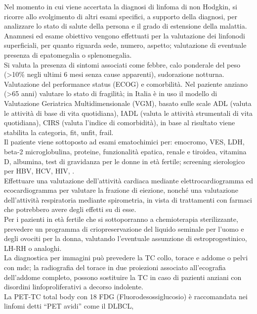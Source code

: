 Nel momento in cui viene accertata la diagnosi di linfoma di non Hodgkin, si ricorre allo svolgimento di altri 
esami specifici, a supporto della diagnosi, per analizzare lo stato di salute della persona e il grado di 
estensione della malattia.\\
Anamnesi ed esame obiettivo vengono effettuati per la valutazione dei linfonodi superficiali, per quanto riguarda sede, numero, aspetto; 
valutazione di eventuale presenza di epatomegalia o splenomegalia.\\
Si valuta la presenza di sintomi associati come febbre, calo ponderale del peso 
(>10\% negli ultimi 6 mesi senza cause apparenti), sudorazione notturna\cite{reteveneta}.\\
Valutazione del performance status (ECOG) e comorbilità. 
Nel paziente anziano (>65 anni) valutare lo stato di fragilità; in Italia è in uso il modello di 
Valutazione Geriatrica Multidimensionale (VGM), basato sulle scale ADL (valuta le attività di base di vita quotidiana),
 IADL (valuta le attività strumentali di vita quotidiana), CIRS (valuta l’indice di comorbidità), 
 in base al risultato viene stabilita la categoria, fit, unfit, frail\cite{reteveneta}.\\
 Il paziente viene sottoposto ad esami ematochimici per: emocromo, VES, LDH, beta-2 microglobulina, proteine, 
 funzionalità epatica, renale e tiroidea, vitamina D, albumina, test di gravidanza per le donne in età fertile; 
 screening sierologico per HBV, HCV, HIV\cite{AIOM}, \cite{reteveneta}.\\
Effettuare una valutazione dell’attività cardiaca mediante elettrocardiogramma ed ecocardiogramma per valutare 
la frazione di eiezione, nonché una valutazione dell’attività respiratoria mediante spirometria, in vista di 
trattamenti con farmaci che potrebbero avere degli effetti su di esse\cite{AIOM}.\\ 
Per i pazienti in età fertile che si sottoporranno a chemioterapia sterilizzante, prevedere un programma di 
criopreservazione del liquido seminale per l’uomo e degli ovociti per la donna, valutando l’eventuale assunzione di 
estroprogestinico, LH-RH o analoghi\cite{AIOM}.\\
La diagnostica per immagini può prevedere la TC collo, torace e addome o pelvi con mdc; la radiografia del torace 
in due proiezioni associato all’ecografia dell’addome completo, possono sostituire la TC in caso di pazienti 
anziani con disordini linfoproliferativi a decorso indolente.\\
La PET-TC total body con 18 FDG (Fluorodesossiglucosio) è raccomandata nei linfomi detti “PET avidi” come il DLBCL, 
